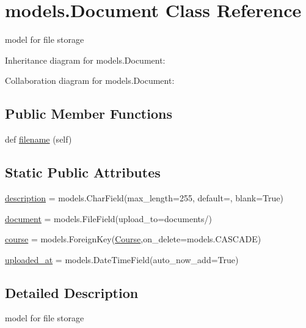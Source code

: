 \hypertarget{classmodels_1_1_document}{}\section{models.\+Document Class Reference}
\label{classmodels_1_1_document}


model for file storage  




Inheritance diagram for models.\+Document\+:


Collaboration diagram for models.\+Document\+:
\subsection*{Public Member Functions}
\begin{DoxyCompactItemize}
\item 
def \hyperlink{classmodels_1_1_document_a4683bce818a85a1f1b53a5f2bfd5c6f4}{filename} (self)
\end{DoxyCompactItemize}
\subsection*{Static Public Attributes}
\begin{DoxyCompactItemize}
\item 
\hyperlink{classmodels_1_1_document_ad2ff6fb15248dcc29023e9cf3a82fa16}{description} = models.\+Char\+Field(max\+\_\+length=255, default=\textquotesingle{}\textquotesingle{}, blank=True)
\item 
\hyperlink{classmodels_1_1_document_a909e4c96d52c0e135844e3da24d58ee6}{document} = models.\+File\+Field(upload\+\_\+to=\textquotesingle{}documents/\textquotesingle{})
\item 
\hyperlink{classmodels_1_1_document_aa9b83515500b7a930d2d516db56daa0a}{course} = models.\+Foreign\+Key(\hyperlink{classmodels_1_1_course}{Course},on\+\_\+delete=models.\+C\+A\+S\+C\+A\+DE)
\item 
\hyperlink{classmodels_1_1_document_ae51e1350a7de5df17e76ce487f816a8b}{uploaded\+\_\+at} = models.\+Date\+Time\+Field(auto\+\_\+now\+\_\+add=True)
\end{DoxyCompactItemize}


\subsection{Detailed Description}
model for file storage 

